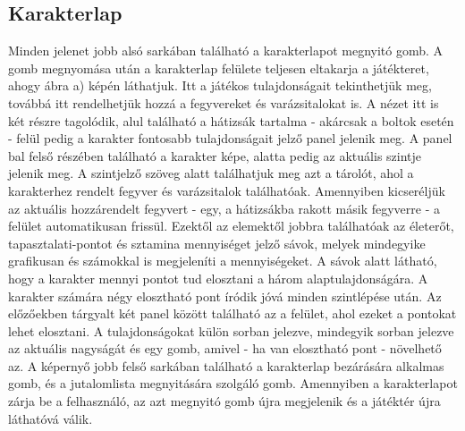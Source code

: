 \subsection*{Karakterlap}
\label{karakterlap}
Minden jelenet jobb alsó sarkában található a karakterlapot megnyitó gomb. 
A gomb megnyomása után a karakterlap felülete teljesen eltakarja a játékteret, ahogy  ábra a) képén láthatjuk. 
Itt a játékos tulajdonságait tekinthetjük meg, továbbá itt rendelhetjük hozzá a fegyvereket és varázsitalokat is. 
A nézet itt is két részre tagolódik, alul található a hátizsák tartalma - akárcsak a boltok esetén - felül pedig a karakter fontosabb tulajdonságait jelző panel jelenik meg. 
A panel bal felső részében található a karakter képe, alatta pedig az aktuális szintje jelenik meg. 
A szintjelző szöveg alatt találhatjuk meg azt a tárolót, ahol a karakterhez rendelt fegyver és varázsitalok találhatóak. 
Amennyiben kicseréljük az aktuális hozzárendelt fegyvert - egy, a hátizsákba rakott másik fegyverre - a felület automatikusan frissül. 
Ezektől az elemektől jobbra találhatóak az életerőt, tapasztalati-pontot és sztamina mennyiséget jelző sávok, melyek mindegyike grafikusan és számokkal is megjeleníti a mennyiségeket. 
A sávok alatt látható, hogy a karakter mennyi pontot tud elosztani a három alaptulajdonságára. 
A karakter számára négy elosztható pont íródik jóvá minden szintlépése után. 
Az előzőekben tárgyalt két panel között található az a felület, ahol ezeket a pontokat lehet elosztani. 
A tulajdonságokat külön sorban jelezve, mindegyik sorban jelezve az aktuális nagyságát és egy gomb, amivel - ha van elosztható pont - növelhető az. 
A képernyő jobb felső sarkában található a karakterlap bezárására alkalmas gomb, és a jutalomlista megnyitására szolgáló gomb. 
Amennyiben a karakterlapot zárja be a felhasználó, az azt megnyitó gomb újra megjelenik és a játéktér újra láthatóvá válik.


